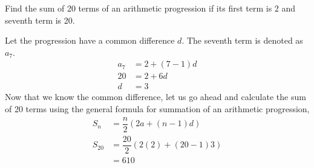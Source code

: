 
%
%
%
%
% 
% 

\question[4] Find the sum of 20 terms of an arithmetic progression if its first term is 2 and seventh term is 20.


\ifprintanswers
\fi 

\begin{solution}[\halfpage]
  Let the progression have a common difference $d$. The seventh term is denoted as $a_7$.
  \begin{align}
    a_7 &= 2 + (7-1)d \\
    20  &= 2 + 6d \\
    d   &= 3 
  \end{align}
  Now that we know the common difference, let us go ahead and calculate the sum of 20 terms using the general formula for summation of an arithmetic progression,
  \begin{align}
    S_n    &= \dfrac{n}{2}(2a + (n-1)d) \\
    S_{20} &= \dfrac{20}{2}(2(2) + (20-1)3) \\
           &= 610
  \end{align}

\end{solution}

